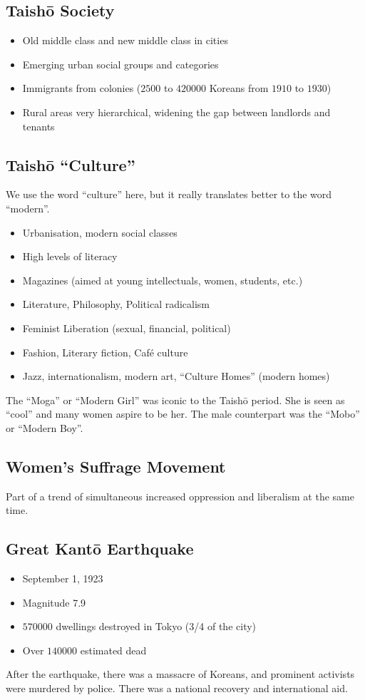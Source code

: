 \documentclass[class=article, crop=false]{standalone}
\begin{document}
  \subsection{Taish\=o Society}
  \begin{itemize}
    \item Old middle class and new middle class in cities
    \item Emerging urban social groups and categories
    \item Immigrants from colonies ($2500$ to $420000$ Koreans from $1910$ to $1930$)
    \item Rural areas very hierarchical, widening the gap between landlords and tenants
  \end{itemize}
  \subsection{Taish\=o ``Culture''}
  \begin{note}{}
    We use the word ``culture'' here, but it really translates better to the word ``modern''.
  \end{note}
  \begin{itemize}
    \item Urbanisation, modern social classes
    \item High levels of literacy
    \item Magazines (aimed at young intellectuals, women, students, etc.)
    \item Literature, Philosophy, Political radicalism
    \item Feminist Liberation (sexual, financial, political)
    \item Fashion, Literary fiction, Caf\'e culture
    \item Jazz, internationalism, modern art, ``Culture Homes'' (modern homes)
  \end{itemize}
  \begin{note}{}
    The ``Moga'' or ``Modern Girl'' was iconic to the Taish\=o period. She is seen as ``cool'' and many women aspire to be her. The male counterpart was the ``Mobo'' or ``Modern Boy''.
  \end{note}
  \subsection{Women's Suffrage Movement}
  Part of a trend of simultaneous increased oppression and liberalism at the same time.
  \subsection{Great Kant\=o Earthquake}
  \begin{itemize}
    \item September 1, 1923
    \item Magnitude 7.9
    \item $570000$ dwellings destroyed in Tokyo (3/4 of the city)
    \item Over $140000$ estimated dead
  \end{itemize}
  After the earthquake, there was a massacre of Koreans, and prominent activists were murdered by police. There was a national recovery and international aid.
\end{document}
